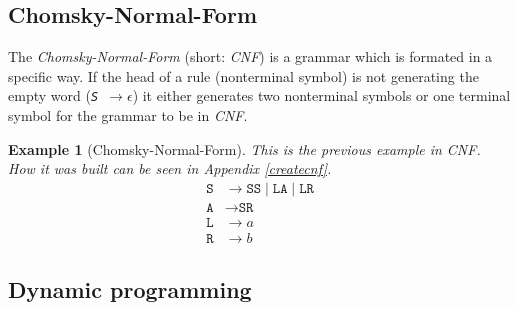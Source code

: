\documentclass[a4paper, 11pt]{article}
\newtheorem*{example*}{Example}
\begin{document}

\subsection{Chomsky-Normal-Form}
\label{cnf}

The \textit{Chomsky-Normal-Form} (short: \textit{CNF}) is a grammar which is formated in a specific way. If the head of a rule (nonterminal symbol) is not generating the empty word (\textit{\texttt{S $\rightarrow \epsilon$}}) it either generates two nonterminal symbols or one terminal symbol for the grammar to be in \textit{CNF}.
\cite{CNF}

\begin{example*}[Chomsky-Normal-Form]
This is the previous example in CNF. How it was built can be seen in Appendix \ref{createcnf}.
\begin{align*}
\texttt{S} & \rightarrow \texttt{SS} \mid  \texttt{LA} \mid \texttt{LR} \\
\texttt{A} & \rightarrow \texttt{SR} \\
\texttt{L} & \rightarrow a \\
\texttt{R} & \rightarrow b
\end{align*}
\end{example*}



\subsection{Dynamic programming}
\label{dp}
\end{document}
